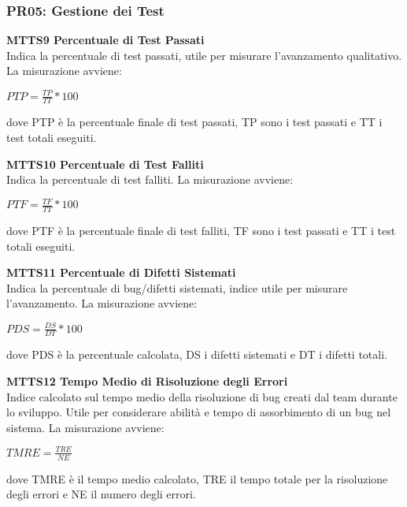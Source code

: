 \subsubsection{PR05: Gestione dei Test}
\begin{itemize}

	\item \textbf{MTTS9 Percentuale di Test Passati}\-\\
Indica la percentuale di test passati, utile per misurare l'avanzamento qualitativo. La misurazione avviene:
\begin{center}
	\item $PTP = \frac{TP}{TT}*100$
\end{center}
dove PTP è la percentuale finale di test passati, TP sono i test passati e TT i test totali eseguiti.

	\item \textbf{MTTS10 Percentuale di Test Falliti}\-\\
Indica la percentuale di test falliti. La misurazione avviene:
\begin{center}
	\item $PTF = \frac{TF}{TT}*100$
\end{center}
dove PTF è la percentuale finale di test falliti, TF sono i test passati e TT i test totali eseguiti.

	\item \textbf{MTTS11 Percentuale di Difetti Sistemati}\-\\
Indica la percentuale di bug/difetti sistemati, indice utile per misurare l'avanzamento. La misurazione avviene:
\begin{center}
	\item $PDS = \frac{DS}{DT}*100$
\end{center}
dove PDS è la percentuale calcolata, DS i difetti sistemati e DT i difetti totali.

	\item \textbf{MTTS12 Tempo Medio di Risoluzione degli Errori}\-\\
Indice calcolato sul tempo medio della risoluzione di bug creati dal team durante lo sviluppo. Utile per considerare abilità e tempo di assorbimento di un bug nel sistema. La misurazione avviene:
\begin{center}
	\item $TMRE = \frac{TRE}{NE}$
\end{center}
dove TMRE è il tempo medio calcolato, TRE il tempo totale per la risoluzione degli errori e NE il numero degli errori.


\end{itemize}
